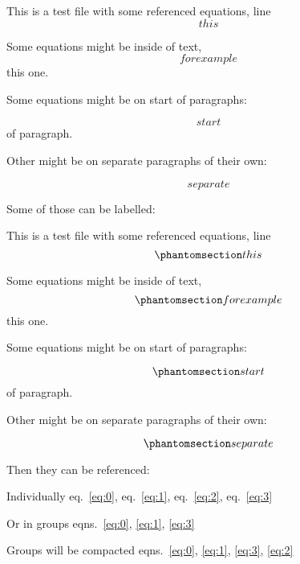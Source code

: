 This is a test file with some referenced equations, line
\begin{equation}{ this }\end{equation}

Some equations might be inside of text,
\begin{equation}{ for example }\end{equation} this one.

Some equations might be on start of paragraphs:

\begin{equation}{ start }\end{equation} of paragraph.

Other might be on separate paragraphs of their own:

\begin{equation}{ separate }\end{equation}

Some of those can be labelled:

This is a test file with some referenced equations, line
\begin{equation}\phantomsection\label{eq:0}{ this }\end{equation}

Some equations might be inside of text,
\begin{equation}\phantomsection\label{eq:1}{ for example }\end{equation}
this one.

Some equations might be on start of paragraphs:

\begin{equation}\phantomsection\label{eq:2}{ start }\end{equation} of
paragraph.

Other might be on separate paragraphs of their own:

\begin{equation}\phantomsection\label{eq:3}{ separate }\end{equation}

Then they can be referenced:

Individually eq.~\ref{eq:0}, eq.~\ref{eq:1}, eq.~\ref{eq:2},
eq.~\ref{eq:3}

Or in groups eqns.~\ref{eq:0}, \ref{eq:1}, \ref{eq:3}

Groups will be compacted
eqns.~\ref{eq:0}, \ref{eq:1}, \ref{eq:3}, \ref{eq:2}
